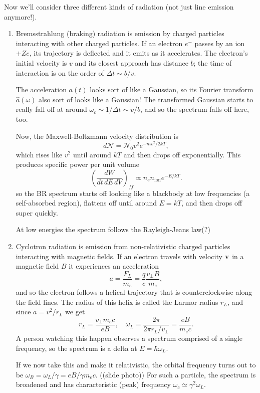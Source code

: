 \documentclass[../a122main.tex]{subfiles}
\begin{document}
Now we'll consider three different kinds of radiation (not just line emission anymore!).
\begin{enumerate}[topsep=0pt]
    \item Bremsstrahlung (braking) radiation is emission by charged particles interacting with other charged particles.
    If an electron $e^-$ passes by an ion $+Ze$, its trajectory is deflected and it emits as it accelerates.
    The electron's initial velocity is $v$ and its closest approach has distance $b$; the time of interaction is on the order of $\Delta t \sim b / v$.

    The acceleration $a(t)$ looks sort of like a Gaussian, so its Fourier transform $\hat a(\omega)$ also sort of looks like a Gaussian!
    The transformed Gaussian starts to really fall off at around $\omega_c \sim 1 / \Delta t \sim v / b$, and so the spectrum falls off here, too.

    Now, the Maxwell-Boltzmann velocity distribution is
    \[ d \mathcal N = \mathcal N_0 v^2 e^{-mv^2 / 2kT}, \]
    which rises like $v^2$ until around $kT$ and then drops off exponentially.
    This produces specific power per unit volume
    \[ \left( \frac{dW}{dt \, dE \, dV} \right)_{ff} \propto n_e n_\textrm{ion} e^{-E / kT}. \]
    so the BR spectrum starts off looking like a blackbody at low frequencies (a self-absorbed region), flattens off until around $E = kT$, and then drops off super quickly.
    
    At low energies the spectrum follows the Rayleigh-Jeans law(?)

    \item Cyclotron radiation is emission from non-relativistic charged particles interacting with magnetic fields.
    If an electron travels with velocity $\mathbf{v}$ in a magnetic field $B$ it experiences an acceleration
    \[ a = \frac{F_L}{m_e} = \frac{q}{c} \frac{v_\perp B}{m_e}, \]
    and so the electron follows a helical trajectory that is counterclockwise along the field lines.
    The radius of this helix is called the Larmor radius $r_L$, and since $a = v^2 / r_L$ we get
    \[ r_L = \frac{v_\perp m_e c}{eB}, \quad \omega_L = \frac{2\pi}{2\pi r_L / v_\perp} = \frac{eB}{m_e c}. \]
    A person watching this happen observes a spectrum comprised of a single frequency, so the spectrum is a delta at $E = \hbar \omega_L$.

    If we now take this and make it relativistic, the orbital frequency turns out to be $\omega_B = \omega_L / \gamma = eB / \gamma m_e c$.
    ((slide photo))
    For such a particle, the spectrum is broadened and has characteristic (peak) frequency $\omega_c \simeq \gamma^2 \omega_L$.


\end{enumerate}
\end{document}
